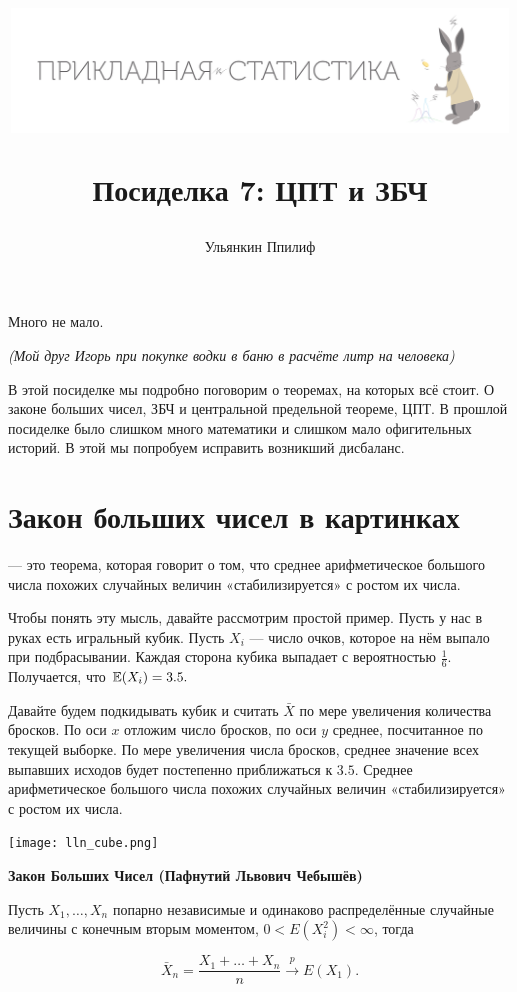\documentclass[12pt, a4paper, oneside]{article}
\title{
\begin{center} 
\includegraphics[width=0.99\textwidth]{logo.png}
\end{center}

Посиделка 7: ЦПТ и ЗБЧ}
\date{ } %
\author{Ульянкин Ппилиф}
\begin{document}

\maketitle

\epigraph{Много не мало.}{\textit{(Мой друг Игорь при покупке водки  в баню \newline в расчёте литр на человека)}}

В этой посиделке мы подробно поговорим о теоремах, на которых всё стоит. О законе больших чисел, ЗБЧ и центральной предельной теореме, ЦПТ. В прошлой посиделке было слишком много математики и слишком мало офигительных историй. В этой мы попробуем исправить возникший дисбаланс.


\section{Закон больших чисел в картинках}

 --- это теорема, которая говорит о том, что среднее арифметическое большого числа похожих случайных величин  «стабилизируется» с ростом их числа. 

Чтобы понять эту мысль, давайте рассмотрим простой пример. Пусть у нас в руках есть игральный кубик. Пусть $X_i$ --- число очков, которое на нём выпало при подбрасывании. Каждая сторона кубика выпадает с вероятностью $\frac{1}{6}.$ Получается, что $\mathbb{E}(X_i) = 3.5.$ 

Давайте будем подкидывать кубик и считать $\bar X$ по мере увеличения количества бросков. По оси $x$ отложим число бросков, по оси $y$ среднее, посчитанное по текущей выборке. По мере увеличения числа бросков, среднее значение всех выпавших исходов будет постепенно приближаться к $3.5$. Среднее арифметическое большого числа похожих случайных величин  «стабилизируется» с ростом их числа.

\begin{center} 
\texttt{[image: lln\_cube.png]}
\end{center} 


\begin{theorem}{\textbf{Закон Больших Чисел (Пафнутий Львович Чебышёв)}}

Пусть $X_1, \ldots, X_n$ попарно независимые и одинаково распределённые случайные величины с конечным вторым моментом, $0 < E(X_i^2) < \infty$, тогда

$$
\bar{X}_{n} = \frac{X_1 + \ldots + X_n}{n} \stackrel{p}{\longrightarrow} E(X_1).
$$
\end{theorem}
\end{document}

